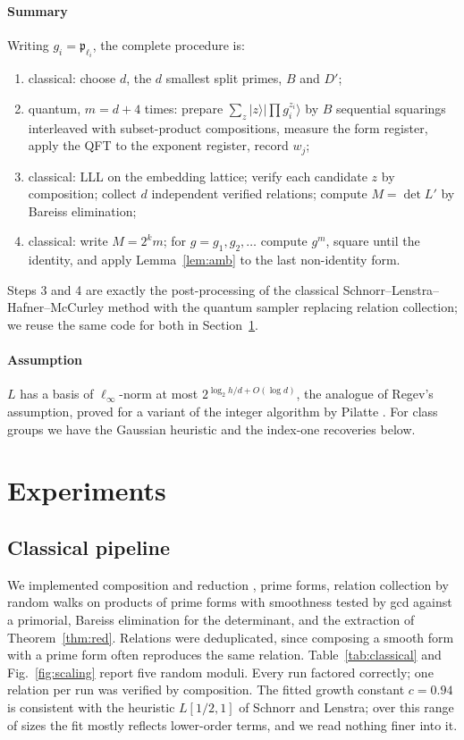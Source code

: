 \documentclass[runningheads]{llncs}
\newcommand{\p}{\mathfrak{p}}
\begin{document}
\paragraph{Summary} Writing $g_i=\p_{\ell_i}$, the complete procedure is:
\begin{enumerate}
\item classical: choose $d$, the $d$ smallest split primes, $B$ and $D'$;
\item quantum, $m=d+4$ times: prepare $\sum_{z}|z\rangle|\prod g_i^{z_i}\rangle$ by $B$ sequential squarings interleaved with subset-product compositions, measure the form register, apply the QFT to the exponent register, record $w_j$;
\item classical: LLL on the embedding lattice; verify each candidate $z$ by composition; collect $d$ independent verified relations; compute $M=\det L'$ by Bareiss elimination;
\item classical: write $M=2^km$; for $g=g_1,g_2,\dots$ compute $g^m$, square until the identity, and apply Lemma~\ref{lem:amb} to the last non-identity form.
\end{enumerate}
Steps 3 and 4 are exactly the post-processing of the classical Schnorr--Lenstra--Hafner--McCurley method with the quantum sampler replacing relation collection; we reuse the same code for both in Section~\ref{sec:exp}.

\paragraph{Assumption} $L$ has a basis of $\ell_\infty$-norm at most $2^{\log_2h/d+O(\log d)}$, the analogue of Regev's assumption, proved for a variant of the integer algorithm by Pilatte \cite{pilatte2024}. For class groups we have the Gaussian heuristic and the index-one recoveries below.

\section{Experiments}\label{sec:exp}
\subsection{Classical pipeline}\label{sec:classical}
We implemented composition and reduction \cite{cohen1993}, prime forms, relation collection by random walks on products of prime forms with smoothness tested by gcd against a primorial, Bareiss elimination for the determinant, and the extraction of Theorem~\ref{thm:red}. Relations were deduplicated, since composing a smooth form with a prime form often reproduces the same relation. Table~\ref{tab:classical} and Fig.~\ref{fig:scaling} report five random moduli. Every run factored correctly; one relation per run was verified by composition. The fitted growth constant $c=0.94$ is consistent with the heuristic $L[1/2,1]$ of Schnorr and Lenstra; over this range of sizes the fit mostly reflects lower-order terms, and we read nothing finer into it.
\end{document}

